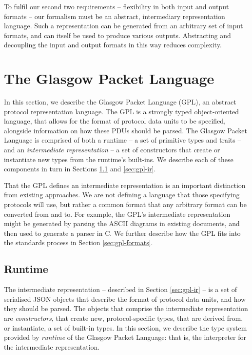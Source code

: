 \documentclass[10pt,sigconf]{acmart}
\begin{document}
To fulfil our second two requirements -- flexibility in both input and output formats --
our formalism must be an abstract, intermediary representation language. Such a
representation can be generated from an arbitrary set of input formats, and can itself be
used to produce various outputs. Abstracting and decoupling the input and output formats
in this way reduces complexity.

\section{The Glasgow Packet Language}
\label{sec:gpl}

In this section, we describe the Glasgow Packet Language (GPL), an abstract protocol
representation language. The GPL is a strongly typed object-oriented language, that allows
for the format of protocol data units to be specified, alongside information on how these
PDUs should be parsed. The Glasgow Packet Language is comprised of both a runtime -- a set
of primitive types and traits -- and an \emph{intermediate representation} -- a set of
constructors that create or instantiate new types from the runtime's built-ins. We
describe each of these components in turn in Sections \ref{sec:gpl-runtime} and
\ref{sec:gpl-ir}.

That the GPL defines an intermediate representation is an important distinction from
existing approaches. We are not defining a language that those specifying protocols will
use, but rather a common format that any arbitrary format can be converted from and to.
For example, the GPL's intermediate representation might be generated by parsing the ASCII
diagrams in existing documents, and then used to generate a parser in C. We further
describe how the GPL fits into the standards process in Section \ref{sec:gpl-formats}.

\subsection{Runtime}
\label{sec:gpl-runtime}

The intermediate representation -- described in Section \ref{sec:gpl-ir} -- is a set of
serialised JSON objects that describe the format of protocol data units, and how they
should be parsed. The objects that comprise the intermediate representation are
\emph{constructors}, that create new, protocol-specific types, that are derived from, or
instantiate, a set of built-in types. In this section, we describe the type system
provided by \emph{runtime} of the Glasgow Packet Language: that is, the interpreter for
the intermediate representation.
\end{document}
